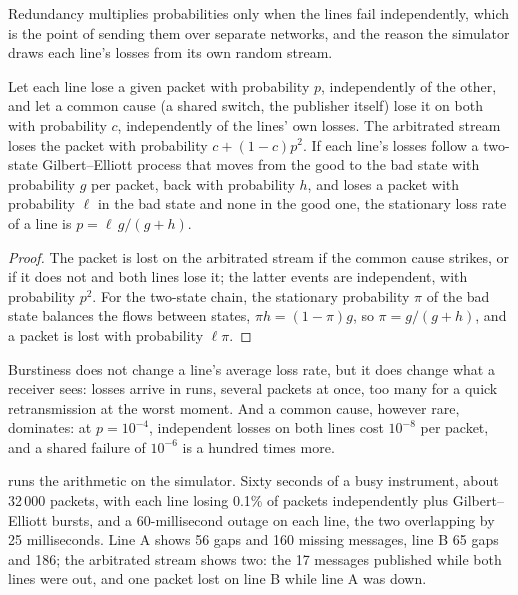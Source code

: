 \label{lst:ll:protocols-ii-binary-exchange-protocols:arb}

Redundancy multiplies probabilities only when the lines fail independently, which is the point of sending them over separate
networks, and the reason the simulator draws each line's losses from its own random stream.

\begin{proposition}\label{prop:ll:protocols-ii-binary-exchange-protocols:both}
Let each line lose a given packet with probability $p$, independently of the other, and let a common cause (a shared switch,
the publisher itself) lose it on both with probability $c$, independently of the lines' own losses. The arbitrated stream
loses the packet with probability $c + (1 - c)p^2$. If each line's losses follow a two-state Gilbert--Elliott process that
moves from the good to the bad state with probability $g$ per packet, back with probability $h$, and loses a packet with
probability $\ell$ in the bad state and none in the good one, the stationary loss rate of a line is $p = \ell\, g/(g+h)$.
\end{proposition}

\begin{proof}
The packet is lost on the arbitrated stream if the common cause strikes, or if it does not and both lines lose it; the latter
events are independent, with probability $p^2$. For the two-state chain, the stationary probability $\pi$ of the bad state
balances the flows between states, $\pi h = (1-\pi) g$, so $\pi = g/(g+h)$, and a packet is lost with probability $\ell\pi$.
\end{proof}

Burstiness does not change a line's average loss rate, but it does change what a receiver sees: losses arrive in runs,
several packets at once, too many for a quick retransmission at the worst moment. And a common cause, however rare, dominates:
at $p = 10^{-4}$, independent losses on both lines cost $10^{-8}$ per packet, and a shared failure of $10^{-6}$ is a hundred
times more.

 runs the arithmetic on the simulator. Sixty seconds of a busy
instrument, about 32\,000 packets, with each line losing 0.1\% of packets independently plus Gilbert--Elliott bursts, and a
60-millisecond outage on each line, the two overlapping by 25 milliseconds. Line A shows 56 gaps and 160 missing messages, line
B 65 gaps and 186; the arbitrated stream shows two: the 17 messages published while both lines were out, and one packet lost on
line B while line A was down.

